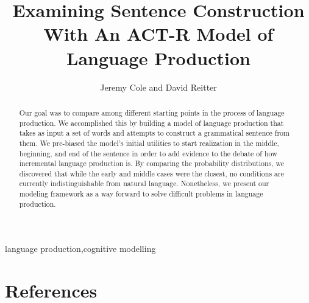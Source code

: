 \documentclass[review]{elsarticle}
\begin{document}
\begin{frontmatter}

\title{Examining Sentence Construction With An ACT-R Model of Language Production}

\author{Jeremy Cole and David Reitter} %
\address{College of Information Science and Technology}
\address{The Pennsylvania State University}


\address{University Park, Pennsylvania}

\begin{abstract}
Our goal was to compare among different starting points in the process of language production. We accomplished this by building a model of language production that takes as input a set of words and attempts to construct a grammatical sentence from them. We pre-biased the model's initial utilities to start realization in the middle, beginning, and end of the sentence in order to add evidence to the debate of how incremental language production is. By comparing the probability distributions, we discovered that while the early and middle cases were the closest, no conditions are currently indistinguishable from natural language. Nonetheless, we present our modeling framework as a way forward to solve difficult problems in language production.
\end{abstract}

\begin{keyword}
language production\sep cognitive modelling
\end{keyword}

\end{frontmatter}

\linenumbers





%
%
%
%




%
%
%
%

\section*{References}

\end{document}
